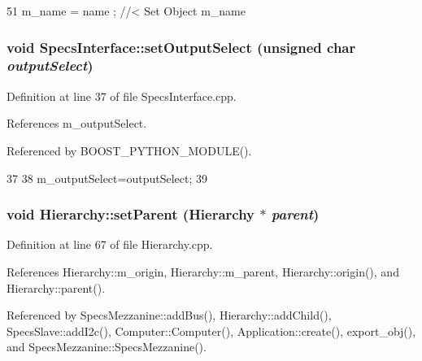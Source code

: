 \begin{DoxyCode}
51 { m_name  = name  ; } //< Set Object m_name
\end{DoxyCode}
\hypertarget{classSpecsInterface_a1907d360f2bda367cfb1d39e379c6493}{
\subsubsection[{setOutputSelect}]{\setlength{\rightskip}{0pt plus 5cm}void SpecsInterface::setOutputSelect (unsigned char {\em outputSelect})}}
\label{classSpecsInterface_a1907d360f2bda367cfb1d39e379c6493}


Definition at line 37 of file SpecsInterface.cpp.

References m\_\-outputSelect.

Referenced by BOOST\_\-PYTHON\_\-MODULE().


\begin{DoxyCode}
37                                                               {
38     m_outputSelect=outputSelect;
39 }
\end{DoxyCode}
\hypertarget{classHierarchy_a585ad1aeec16077a0e532ab8b4fc557b}{
\subsubsection[{setParent}]{\setlength{\rightskip}{0pt plus 5cm}void Hierarchy::setParent ({\bf Hierarchy} $\ast$ {\em parent})}}
\label{classHierarchy_a585ad1aeec16077a0e532ab8b4fc557b}


Definition at line 67 of file Hierarchy.cpp.

References Hierarchy::m\_\-origin, Hierarchy::m\_\-parent, Hierarchy::origin(), and Hierarchy::parent().

Referenced by SpecsMezzanine::addBus(), Hierarchy::addChild(), SpecsSlave::addI2c(), Computer::Computer(), Application::create(), export\_\-obj(), and SpecsMezzanine::SpecsMezzanine().



